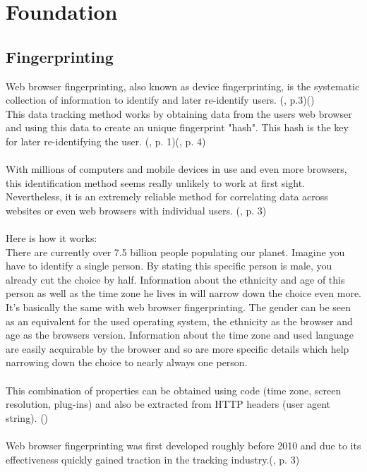 \chapter{Foundation}
\label{cha:foundation}

\section{Fingerprinting}
Web browser fingerprinting, also known as device fingerprinting, is the systematic collection of information to identify and later re-identify users. (\textcite{doty18}, p.3)(\textcite{amiunique})\\
This data tracking method works by obtaining data from the users web browser and using this data to create an unique fingerprint "hash". This hash is the key for later re-identifying the user. (\textcite{upi15}, p. 1)(\textcite{havens16}, p. 4)\\\\
With millions of computers and mobile devices in use and even more browsers, this identification method seems really unlikely to work at first sight. Nevertheless, it is an extremely reliable method for correlating data across websites or even web browsers with individual users. (\textcite{havens16}, p. 3)\\\\
Here is how it works:\\
There are currently over 7.5 billion people populating our planet. Imagine you have to identify a single person. By stating this specific person is male, you already cut the choice by half. Information about the ethnicity and age of this person as well as the time zone he lives in will narrow down the choice even more.\\
It's basically the same with web browser fingerprinting. The gender can be seen as an equivalent for the used operating system, the ethnicity as the browser and age as the browsers version. Information about the time zone and used language are easily acquirable by the browser and so are more specific details which help narrowing down the choice to nearly always one person.\\\\
This combination of properties can be obtained using code (time zone, screen resolution, plug-ins) and also be extracted from HTTP headers (user agent string). (\textcite{miele18}) \\\\
Web browser fingerprinting was first developed roughly before 2010 and due to its effectiveness quickly gained traction in the tracking industry.(\textcite{havens16}, p. 3) \\
